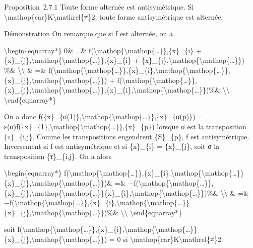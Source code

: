 \documentclass[]{article}
\begin{document}
Proposition~2.7.1 Toute forme alternée est antisymétrique. Si
\textbackslash{}mathop\{car\}K\textbackslash{}mathrel\{≠\}2, toute forme
antisymétrique est alternée.

Démonstration On remarque que si f est alternée, on a

\textbackslash{}begin\{eqnarray*\} 0\& =\&
f(\textbackslash{}mathop\{\textbackslash{}mathop\{\ldots{}\}\},\{x\}\_\{i\}
+
\{x\}\_\{j\},\textbackslash{}mathop\{\textbackslash{}mathop\{\ldots{}\}\},\{x\}\_\{i\}
+
\{x\}\_\{j\},\textbackslash{}mathop\{\textbackslash{}mathop\{\ldots{}\}\})
\%\& \textbackslash{}\textbackslash{} \& =\&
f(\textbackslash{}mathop\{\textbackslash{}mathop\{\ldots{}\}\},\{x\}\_\{i\},\textbackslash{}mathop\{\textbackslash{}mathop\{\ldots{}\}\},\{x\}\_\{j\},\textbackslash{}mathop\{\textbackslash{}mathop\{\ldots{}\}\})
+
f(\textbackslash{}mathop\{\textbackslash{}mathop\{\ldots{}\}\},\{x\}\_\{j\},\textbackslash{}mathop\{\textbackslash{}mathop\{\ldots{}\}\},\{x\}\_\{i\},\textbackslash{}mathop\{\textbackslash{}mathop\{\ldots{}\}\})\%\&
\textbackslash{}\textbackslash{} \textbackslash{}end\{eqnarray*\}

On a donc
f(\{x\}\_\{σ(1)\},\textbackslash{}mathop\{\textbackslash{}mathop\{\ldots{}\}\},\{x\}\_\{σ(p)\})
=
ε(σ)f(\{x\}\_\{1\},\textbackslash{}mathop\{\textbackslash{}mathop\{\ldots{}\}\},\{x\}\_\{p\})
lorsque σ est la transposition \{τ\}\_\{i,j\}. Comme les transpositions
engendrent \{S\}\_\{p\}, f est antisymétrique. Inversement si f est
antisymétrique et si \{x\}\_\{i\} = \{x\}\_\{j\}, soit σ la
transposition \{τ\}\_\{i,j\}. On a alors

\textbackslash{}begin\{eqnarray*\}
f(\textbackslash{}mathop\{\textbackslash{}mathop\{\ldots{}\}\},\{x\}\_\{i\},\textbackslash{}mathop\{\textbackslash{}mathop\{\ldots{}\}\}\{x\}\_\{j\},\textbackslash{}mathop\{\textbackslash{}mathop\{\ldots{}\}\})\&
=\&
−f(\textbackslash{}mathop\{\textbackslash{}mathop\{\ldots{}\}\},\{x\}\_\{j\},\textbackslash{}mathop\{\textbackslash{}mathop\{\ldots{}\}\}\{x\}\_\{i\},\textbackslash{}mathop\{\textbackslash{}mathop\{\ldots{}\}\})\%\&
\textbackslash{}\textbackslash{} \& =\&
−f(\textbackslash{}mathop\{\textbackslash{}mathop\{\ldots{}\}\},\{x\}\_\{i\},\textbackslash{}mathop\{\textbackslash{}mathop\{\ldots{}\}\}\{x\}\_\{j\},\textbackslash{}mathop\{\textbackslash{}mathop\{\ldots{}\}\})\%\&
\textbackslash{}\textbackslash{} \textbackslash{}end\{eqnarray*\}

soit
f(\textbackslash{}mathop\{\textbackslash{}mathop\{\ldots{}\}\},\{x\}\_\{i\},\textbackslash{}mathop\{\textbackslash{}mathop\{\ldots{}\}\}\{x\}\_\{j\},\textbackslash{}mathop\{\textbackslash{}mathop\{\ldots{}\}\})
= 0 si \textbackslash{}mathop\{car\}K\textbackslash{}mathrel\{≠\}2.
\end{document}
